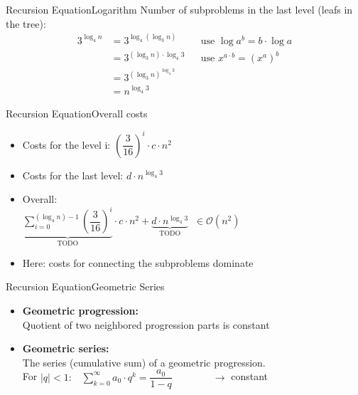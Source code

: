 
\begin{frame}{Recursion Equation}{Logarithm}
	Number of subproblems in the last level (leafs in the tree):
	\begin{align*}
		3^{\log_4 n} & = 3^{\log_4 (\log_3 n)} && \text{use } \log a^b = b \cdot 
		\log a\\
		{} & = 3^{(\log_3 n) \cdot \log_4 3}  && \text{use }x^{a \cdot b} = 
		(x^a)^b\\
		{} & = 3^{(\log_3 n)^{\log_4 3}}\\
		{} & = n^{\log_4 3}
	\end{align*}
\end{frame}


\begin{frame}{Recursion Equation}{Overall costs}
	\begin{itemize}
		\item
			Costs for the level i: $\left(\dfrac{3}{16}\right)^i \cdot c \cdot n^2$
		\item
			Costs for the last level: $d \cdot n^{\log_4 3}$
		\item
			Overall:\\
			$\underbrace{\sum\limits_{i = 0}^{(\log_4 n) - 1} 
			\left(\dfrac{3}{16}\right)^i}_{\text{TODO}} \cdot 
			c \cdot n^2 
			+ \underbrace{d \cdot n^{\log_4 3}}_{\text{TODO}} \;\; \in 
			\mathcal{O}(n^2)$
		\item
			Here: costs for connecting the subproblems dominate
	\end{itemize}
\end{frame}


\begin{frame}{Recursion Equation}{Geometric Series}
	\begin{itemize}
		\item
			\textbf{Geometric progression:}\\
			Quotient of two neighbored progression parts is constant
		\item
			\textbf{Geometric series:}\\
			The series (cumulative sum) of a geometric progression.\\
			For $\mid q \mid < 1: \;\;\; \displaystyle \sum\limits^{\infty}_{k=0} a_0 
			\cdot q^k = \dfrac{a_0}{1 - q}\hspace{4em} \rightarrow$ constant
	\end{itemize}
\end{frame}

